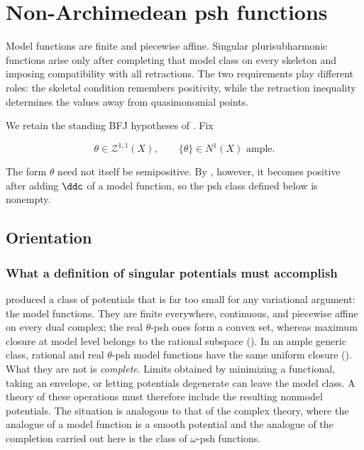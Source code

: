 \chapter{Non-Archimedean psh functions}
\label{chap:bfj-psh}

Model functions are finite and piecewise affine.  Singular
plurisubharmonic functions arise only after completing that model class on
every skeleton and imposing compatibility with all retractions.  The two
requirements play different roles: the skeletal condition remembers
positivity, while the retraction inequality determines the values away from
quasimonomial points.

We retain the standing BFJ hypotheses of
.  Fix

\begin{equation}
\label{eq:ch21-standing-theta}
            \theta\in\mathcal Z^{1,1}(X),
            \qquad \{\theta\}\in N^1(X)\text{ ample}.
\end{equation}

The form $\theta$ need not itself be semipositive.  By
, however, it becomes positive after
adding $\ddc$ of a model function, so the psh class defined below is
nonempty.

\section{Orientation}
\label{sec:ch21-orientation}

\subsection{What a definition of singular potentials must accomplish}
\label{sec:ch21-what-must-be-done}

 produced a class of potentials that is far too
small for any variational argument: the model functions.  They are finite
everywhere, continuous, and piecewise affine on every dual complex; the
real $\theta$-psh ones form a convex set, whereas maximum closure at
model level belongs to the rational subspace
().  In an ample generic class, rational and real
$\theta$-psh model functions have the same uniform closure
().  What they are not is
\emph{complete}.  Limits obtained by minimizing a functional, taking an
envelope, or
letting potentials degenerate can leave the model class.  A theory of these
operations must therefore include the resulting nonmodel potentials.
The situation is analogous to that of the
complex theory, where the analogue of a model function is a smooth
potential and the analogue of the completion carried out here is the class
of $\omega$-psh functions.

